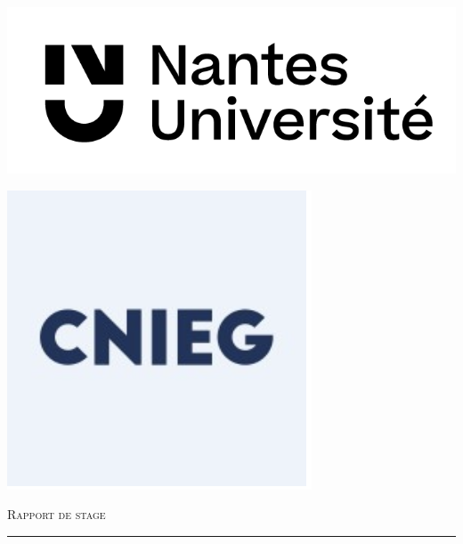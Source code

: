 \documentclass[a4paper,12pt]{report}
\begin{document}
\begin{titlepage}
  \begin{center}
  \centering
  
  \begin{minipage}{0.45\textwidth}
    \raggedright
    \includegraphics[width=\textwidth]{images/logo/logo_univ.png}
  \end{minipage}
  \hfill
  \begin{minipage}{0.25\textwidth}
      \raggedleft
      \includegraphics[width=\textwidth]{images/logo/logo_cnieg.png}
  \end{minipage}

  \vspace{3cm}

  {\scshape\LARGE Rapport de stage \par}
  \vspace{1cm}
  \rule{\textwidth}{0.8pt} \\ 
  \vspace{0,2cm}


\end{center}
\end{titlepage}
\end{document}
